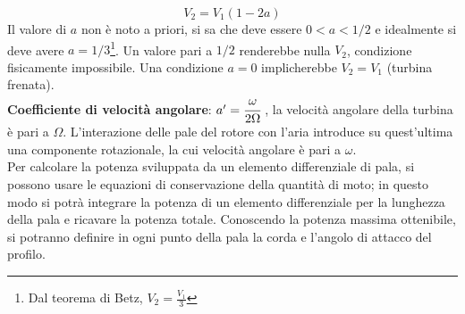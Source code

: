 \begin{equation}\label{eq:v2}
\boxed{V_2 = V_1 (1-2a)}
\end{equation}
Il valore di $a$ non è noto a priori, si sa che deve essere $0 < a < 1/2$ e idealmente si deve avere $a = 1/3$\footnote{Dal teorema di Betz, $V_2=\frac{V_1}{3}$}. Un valore pari a $1/2$ renderebbe nulla $V_2$, condizione fisicamente impossibile. Una condizione $a=0$ implicherebbe $V_2 = V_1$ (turbina frenata).\\
\textbf{Coefficiente di velocità angolare}: $a' = \cfrac{\omega}{2 \Omega}$ , la velocità angolare della turbina è pari a $\Omega$. L'interazione delle pale del rotore con l'aria introduce su quest'ultima una componente rotazionale, la cui velocità angolare è pari a $\omega$.\\

Per calcolare la potenza sviluppata da un elemento differenziale di pala, si possono usare le equazioni di conservazione della quantità di moto; in questo modo si potrà integrare la potenza di un elemento differenziale per la lunghezza della pala e ricavare la potenza totale. Conoscendo la potenza massima ottenibile, si potranno definire in ogni punto della pala la corda e l'angolo di attacco del profilo.

